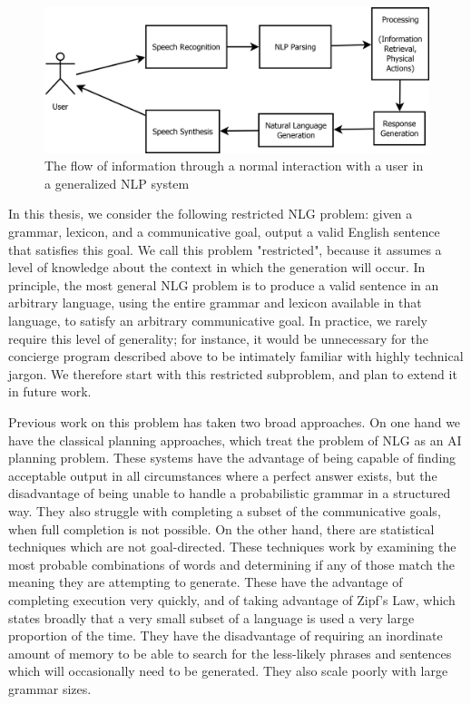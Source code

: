 \begin{figure}
\centering
\includegraphics[width=0.8 \linewidth]{nlp-block.png}
\caption{The flow of information through a normal interaction
with a user in a generalized NLP system}
\label{nlp-block}
\end{figure}

In this thesis, we consider the following restricted NLG problem: given a
grammar, lexicon, and a communicative goal, output a valid English
sentence that satisfies this goal.  We call this problem "restricted", because
it assumes a level of knowledge about the context in which the generation
will occur.  In principle, the most general NLG problem is to produce a valid
sentence in an arbitrary language, using the entire grammar and lexicon available
in that language, to satisfy an arbitrary communicative goal.  In practice, we
rarely require this level of generality; for instance, it would be unnecessary for the concierge
program described above to be intimately familiar with highly technical jargon.
We therefore start with this restricted subproblem, and plan to extend it in future work.

Previous work on this problem has taken two broad approaches.  On one hand we have
the classical planning approaches, which treat the problem of NLG as an AI planning
problem.  These systems have the advantage of being capable of finding acceptable
output in all circumstances where a perfect answer exists, but the disadvantage of
being unable to handle a probabilistic grammar in a structured way.  They also struggle
with completing a subset of the communicative goals, when full completion is not
possible.  On the other hand, there are statistical techniques which are not goal-directed.
These techniques work by examining the
most probable combinations of words and determining if any of those match the
meaning they are attempting to generate.  These have the advantage of completing
execution very quickly, and of taking advantage of Zipf's Law, which states broadly that
a very small subset of a language is used a very large proportion of the time.  They
have the disadvantage of requiring an inordinate amount of memory to be able to search
for the less-likely phrases and sentences which will occasionally need to be generated.
They also scale poorly with large grammar sizes.

